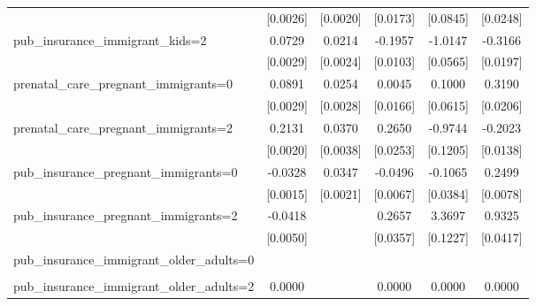 \begin{table}[htbp]
\begin{tabular}{l*{5}{c}}
                    &    [0.0026]         &    [0.0020]         &    [0.0173]         &    [0.0845]         &    [0.0248]         \\
\addlinespace
pub\_insurance\_immigrant\_kids=2&      0.0729\sym{***}&      0.0214\sym{***}&     -0.1957\sym{***}&     -1.0147\sym{***}&     -0.3166\sym{***}\\
                    &    [0.0029]         &    [0.0024]         &    [0.0103]         &    [0.0565]         &    [0.0197]         \\
\addlinespace
prenatal\_care\_pregnant\_immigrants=0&      0.0891\sym{***}&      0.0254\sym{***}&      0.0045         &      0.1000         &      0.3190\sym{***}\\
                    &    [0.0029]         &    [0.0028]         &    [0.0166]         &    [0.0615]         &    [0.0206]         \\
\addlinespace
prenatal\_care\_pregnant\_immigrants=2&      0.2131\sym{***}&      0.0370\sym{***}&      0.2650\sym{***}&     -0.9744\sym{***}&     -0.2023\sym{***}\\
                    &    [0.0020]         &    [0.0038]         &    [0.0253]         &    [0.1205]         &    [0.0138]         \\
\addlinespace
pub\_insurance\_pregnant\_immigrants=0&     -0.0328\sym{***}&      0.0347\sym{***}&     -0.0496\sym{***}&     -0.1065\sym{***}&      0.2499\sym{***}\\
                    &    [0.0015]         &    [0.0021]         &    [0.0067]         &    [0.0384]         &    [0.0078]         \\
\addlinespace
pub\_insurance\_pregnant\_immigrants=2&     -0.0418\sym{***}&                     &      0.2657\sym{***}&      3.3697\sym{***}&      0.9325\sym{***}\\
                    &    [0.0050]         &                     &    [0.0357]         &    [0.1227]         &    [0.0417]         \\
\addlinespace
pub\_insurance\_immigrant\_older\_adults=0&                     &                     &                     &                     &                     \\
                    &                     &                     &                     &                     &                     \\
\addlinespace
pub\_insurance\_immigrant\_older\_adults=2&      0.0000         &                     &      0.0000         &      0.0000         &      0.0000         \\

\end{tabular}
\end{table}
